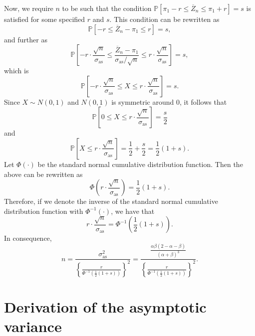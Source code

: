 \documentclass[runningheads,a4paper]{llncs}
\begin{document}
Now, we require $n$ to be such that the condition $\mathbb{P}[\pi_1-r\leq \overline{Z}_n \leq
\pi_1+r] = s$ is satisfied for some specified $r$ and $s$. This condition can be rewritten as
\[
\mathbb{P}[-r\leq \overline{Z}_n-\pi_1 \leq r] = s,
\]
and further as
\[
\mathbb{P}[-r\cdot\frac{\sqrt{n}}{\sigma_{\textrm{as}}}\leq
 \frac{\overline{Z}_n-\pi_1}{\sigma_{\textrm{as}}/\sqrt{n}}
 \leq r\cdot\frac{\sqrt{n}}{\sigma_{\textrm{as}}}] = s,
\]
which is
\[
\mathbb{P}[-r\cdot\frac{\sqrt{n}}{\sigma_{\textrm{as}}}\leq X \leq
 r\cdot\frac{\sqrt{n}}{\sigma_{\textrm{as}}}] = s.
\]
Since $X \sim N(0,1)$ and $N(0,1)$ is symmetric around $0$, it follows that
\[
\mathbb{P}[0 \leq X \leq r\cdot\frac{\sqrt{n}}{\sigma_{\textrm{as}}}] = \frac{s}{2}
\]
and
\[
\mathbb{P}[X \leq r\cdot\frac{\sqrt{n}}{\sigma_{\textrm{as}}}] =
\frac{1}{2}+\frac{s}{2}=\frac{1}{2}(1+s).
\]
Let $\Phi(\cdot)$ be the standard normal cumulative distribution function. Then the above
can be rewritten as
\[
\Phi(r\cdot\frac{\sqrt{n}}{\sigma_{\textrm{as}}}) = \frac{1}{2}(1+s).
\]
Therefore, if we denote the inverse of the standard normal cumulative distribution function
with $\Phi^{-1}(\cdot)$, we have that
\[
r\cdot\frac{\sqrt{n}}{\sigma_{\textrm{as}}} = \Phi^{-1}(\frac{1}{2}(1+s)).
\]
In consequence,
\[
n = \frac{\sigma_{\textrm{as}}^2}{\left\{\frac{r}{\Phi^{-1}(\frac{1}{2}(1+s))}\right\}^2}=
\frac{\frac{\alpha\beta(2-\alpha-\beta)}{(\alpha+\beta)^3}}
{\left\{\frac{r}{\Phi^{-1}(\frac{1}{2}(1+s))}\right\}^2}.
\]

\section{Derivation of the asymptotic variance}
\label{app:as_var}
\end{document}
